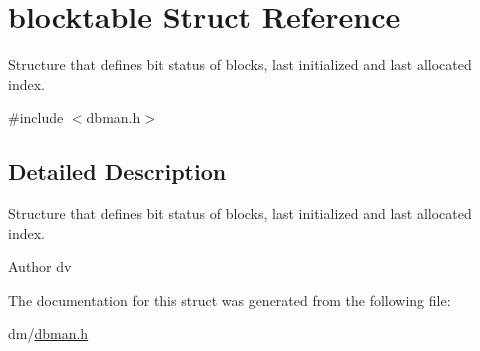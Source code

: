 \hypertarget{structblocktable}{\section{blocktable Struct Reference}
\label{structblocktable}
}


Structure that defines bit status of blocks, last initialized and last allocated index.  




{\ttfamily \#include $<$dbman.\+h$>$}



\subsection{Detailed Description}
Structure that defines bit status of blocks, last initialized and last allocated index. 

\begin{DoxyAuthor}{Author}
dv 
\end{DoxyAuthor}


The documentation for this struct was generated from the following file\+:\begin{DoxyCompactItemize}
\item 
dm/\hyperlink{dbman_8h}{dbman.\+h}\end{DoxyCompactItemize}
